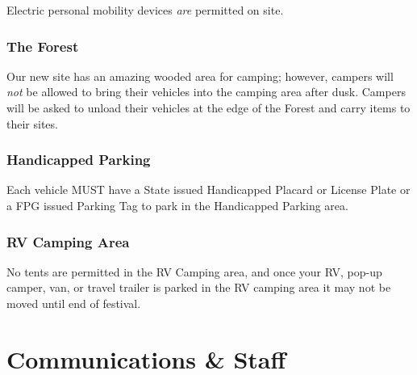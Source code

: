 \documentclass[9pt,twoside,openright,final,article,letterpaper]{memoir}
\let\oldsection=\section
\renewcommand{\section}[1]{%
  \nopagebreak
  \vspace{6pt} %
  \needspace{1.5in}
  \oldsection{#1}
  \nopagebreak}
\let\oldsubsubsection=\subsubsection
\renewcommand{\subsubsection}[1]{%
  \needspace{.75in}
  \oldsubsubsection{#1}
  \nopagebreak}
\begin{document}
\begin{multicols}{2}
  \vspace{8pt}

  Electric personal mobility devices \emph{are} permitted on site.

  \subsubsection{The Forest}

  Our new site has an amazing wooded area for camping; however, campers
  will \emph{not} be allowed to bring their vehicles into the camping
  area after dusk. Campers will be asked to unload their vehicles at the
  edge of the Forest and carry items to their sites.

  \subsubsection{Handicapped Parking}

  Each vehicle MUST have a State issued Handicapped Placard or License
  Plate or a FPG issued Parking Tag to park in the Handicapped
  Parking area.

  \subsubsection{RV Camping Area}

  No tents are permitted in the RV Camping area, and once your RV,
  pop-up camper, van, or travel trailer is parked in the RV camping
  area it may not be moved until end of festival.

\end{multicols}


\section{Communications \& Staff}
\end{document}
